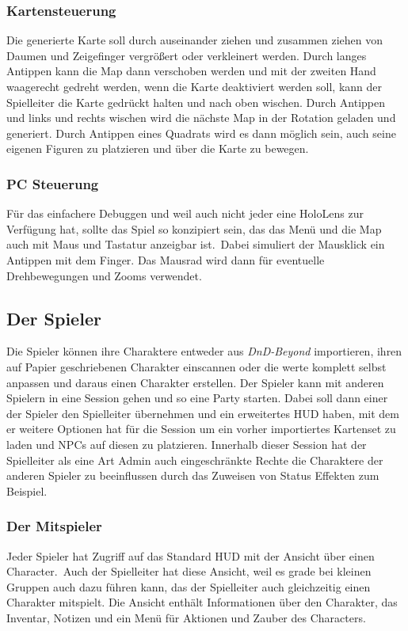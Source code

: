 \subsubsection{Kartensteuerung}
Die generierte Karte soll durch auseinander ziehen und zusammen ziehen von Daumen und Zeigefinger vergrößert oder
verkleinert werden.
Durch langes Antippen kann die Map dann verschoben werden und mit der zweiten Hand waagerecht gedreht werden,
wenn die Karte deaktiviert werden soll, kann der Spielleiter die Karte gedrückt halten und nach oben wischen.
Durch Antippen und links und rechts wischen wird die nächste Map in der Rotation geladen und generiert.
Durch Antippen eines Quadrats wird es dann möglich sein, auch seine eigenen Figuren zu platzieren und über die Karte zu
bewegen.

\subsubsection{PC Steuerung}
Für das einfachere Debuggen und weil auch nicht jeder eine HoloLens zur Verfügung hat, sollte das Spiel so konzipiert sein,
das das Menü und die Map auch mit Maus und Tastatur anzeigbar ist.\ Dabei simuliert der Mausklick ein Antippen mit dem Finger.
Das Mausrad wird dann für eventuelle Drehbewegungen und Zooms verwendet.

\subsection{Der Spieler}\label{subsec:gameplay_player}
Die Spieler können ihre Charaktere entweder aus \textit{DnD-Beyond} importieren, ihren auf Papier geschriebenen Charakter
einscannen oder die werte komplett selbst anpassen und daraus einen Charakter erstellen.
Der Spieler kann mit anderen Spielern in eine Session gehen und so eine Party starten.
Dabei soll dann einer der Spieler den Spielleiter übernehmen und ein erweitertes HUD haben, mit dem er weitere Optionen
hat für die Session um ein vorher importiertes Kartenset zu laden und NPCs auf diesen zu platzieren.
Innerhalb dieser Session hat der Spielleiter als eine Art Admin auch eingeschränkte Rechte die Charaktere der anderen
Spieler zu beeinflussen durch das Zuweisen von Status Effekten zum Beispiel.

\subsubsection{Der Mitspieler}
Jeder Spieler hat Zugriff auf das Standard HUD mit der Ansicht über einen Character.\ Auch der Spielleiter hat diese
Ansicht, weil es grade bei kleinen Gruppen auch dazu führen kann, das der Spielleiter auch gleichzeitig einen Charakter
mitspielt.
Die Ansicht enthält Informationen über den Charakter, das Inventar, Notizen und ein Menü für Aktionen und Zauber des
Characters.
\newblock